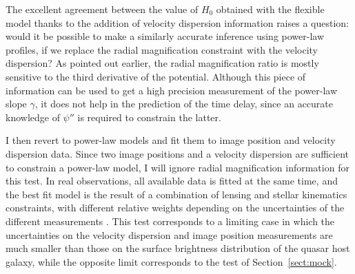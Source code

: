 \documentclass[usenatbib]{mnras}
\def\psiii{\psi''}
\def\Sref#1{Section~\ref{#1}\xspace}
\begin{document}
The excellent agreement between the value of $H_0$ obtained with the flexible model thanks to the addition of velocity dispersion information raises a question: would it be possible to make a similarly accurate inference using power-law profiles, if we replace the radial magnification constraint with the velocity dispersion?
As pointed out earlier, the radial magnification ratio is mostly sensitive to the third derivative of the potential. Although this piece of information can be used to get a high precision measurement of the power-law slope $\gamma$, it does not help in the prediction of the time delay, since an accurate knowledge of $\psiii$ is required to constrain the latter.

I then revert to power-law models and fit them to image position and velocity dispersion data.
Since two image positions and a velocity dispersion are sufficient to constrain a power-law model, I will ignore radial magnification information for this test.
In real observations, all available data is fitted at the same time, and the best fit model is the result of a combination of lensing and stellar kinematics constraints, with different relative weights depending on the uncertainties of the different measurements \citep[see e.g.][for an example of how velocity dispersion changes the inference with respect to a lensing-only fit]{Suy++14}.
This test corresponds to a limiting case in which the uncertainties on the velocity dispersion and image position measurements are much smaller than those on the surface brightness distribution of the quasar host galaxy, while the opposite limit corresponds to the test of \Sref{sect:mock}.
\end{document}
